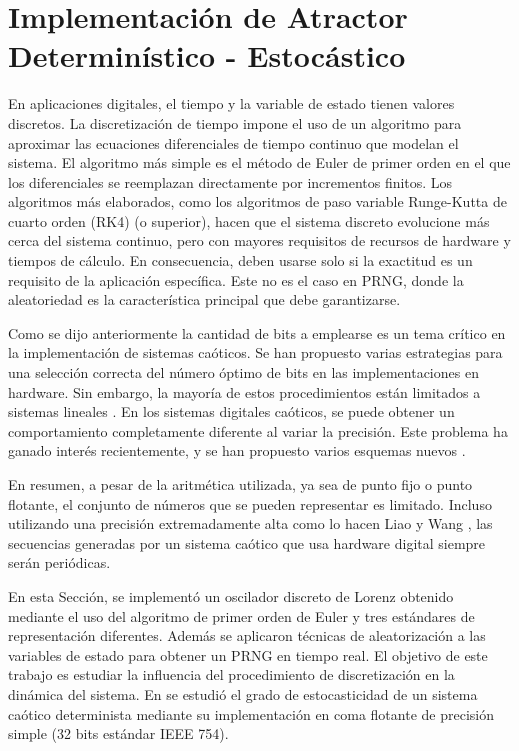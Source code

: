 \section{Implementación de Atractor Determinístico - Estocástico}
\label{sec:AnalysisImpLorenz}

En aplicaciones digitales, el tiempo y la variable de estado tienen valores discretos.
La discretización de tiempo impone el uso de un algoritmo para aproximar las ecuaciones diferenciales de tiempo continuo que modelan el sistema.
El algoritmo más simple es el método de Euler de primer orden en el que los diferenciales se reemplazan directamente por incrementos finitos.
Los algoritmos más elaborados, como los algoritmos de paso variable Runge-Kutta de cuarto orden (RK4) (o superior), hacen que el sistema discreto evolucione más cerca del sistema continuo, pero con mayores requisitos de recursos de hardware y tiempos de cálculo.
En consecuencia, deben usarse solo si la exactitud es un requisito de la aplicación específica.
Este no es el caso en PRNG, donde la aleatoriedad es la característica principal que debe garantizarse.

Como se dijo anteriormente la cantidad de bits a emplearse es un tema crítico en la implementación de sistemas caóticos. Se han propuesto varias estrategias para una selección correcta del número óptimo de bits en las implementaciones en hardware.
Sin embargo, la mayoría de estos procedimientos están limitados a sistemas lineales \cite{Constantinides2002, Constantinides2003}.
En los sistemas digitales caóticos, se puede obtener un comportamiento completamente diferente al variar la precisión.
Este problema ha ganado interés recientemente, y se han propuesto varios esquemas nuevos \cite{Ding2007, Asseri2002, Azzaz2009}.

En resumen, a pesar de la aritmética utilizada, ya sea de punto fijo o punto flotante, el conjunto de números que se pueden representar es limitado.
Incluso utilizando una precisión extremadamente alta como lo hacen Liao y Wang \cite{Liao2013a}, las secuencias generadas por un sistema caótico que usa hardware digital siempre serán periódicas.

En esta Sección, se implementó un oscilador discreto de Lorenz obtenido mediante el uso del algoritmo de primer orden de Euler y tres estándares de representación diferentes.
Además se aplicaron técnicas de aleatorización a las variables de estado para obtener un PRNG en tiempo real.
El objetivo de este trabajo es estudiar la influencia del procedimiento de discretización en la dinámica del sistema.
En \cite{DeMicco2010} se estudió el grado de estocasticidad de un sistema caótico determinista mediante su implementación en coma flotante de precisión simple (32 bits estándar IEEE 754).

